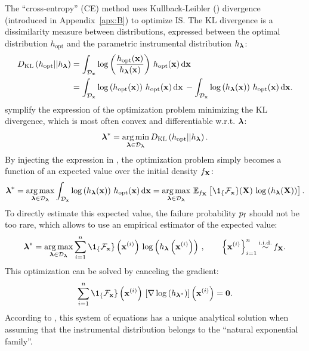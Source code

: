 The ``cross-entropy'' (CE) method \citep{rubinstein_2004_CE} uses Kullback-Leibler () divergence (introduced in Appendix~\ref{apx:B}) to optimize IS. 
The KL divergence is a dissimilarity measure between distributions, expressed between the optimal distribution $h_{\mathrm{opt}}$ and the parametric instrumental distribution $h_{\boldsymbol{\lambda}}$: 
\begin{subequations}
    \begin{align}
        D_{\mathrm{KL}}\left(h_{\mathrm{opt}} || h_{\boldsymbol{\lambda}}\right) &= \int_{\mathcal{D}_{\bf x}} \log \left(\frac{h_{\mathrm{opt}}({\bf x})}{h_{\boldsymbol{\lambda}}({\bf x})}\right) \, h_{\mathrm{opt}}({\bf x}) \, \mathrm{d} {\bf x}\\
            &= \int_{\mathcal{D}_{\bf x}} \log\left(h_{\mathrm{opt}}({\bf x})\right) \, h_{\mathrm{opt}}({\bf x}) \, \mathrm{d} {\bf x} \, - \int_{\mathcal{D}_{\bf x}} \log\left(h_{\boldsymbol{\lambda}}({\bf x})\right) \, h_{\mathrm{opt}}({\bf x}) \, \mathrm{d} {\bf x}.
    \label{eq:KL}
    \end{align}
\end{subequations}
\citet{rubinstein_2004_CE} symplify the expression of the optimization problem minimizing the KL divergence, which is most often convex and differentiable w.r.t. ${\boldsymbol{\lambda}}$:  
\begin{equation}
    {\boldsymbol{\lambda}}^* = \operatorname*{arg\,min}_{{\boldsymbol{\lambda}} \in \mathcal{D}_{\boldsymbol{\lambda}}} D_{\mathrm{KL}}\left(h_{\mathrm{opt}} || h_{\boldsymbol{\lambda}}\right). 
\end{equation}
By injecting the expression in , the optimization problem simply becomes a function of an expected value over the initial density $f_{\bf X}$:
\begin{equation}
    \blambda^* = \argmax_{\blambda \in \iD_\blambda} \int_{\iD_\bx} \log\left(h_\blambda(\bx)\right) \, h_{\mathrm{opt}}(\bx) \, \dd \bx
                = \argmax_{\blambda \in \iD_\blambda} \, \E_{f_\bX}\left[\1_\{\iF_\bx\}(\bX) \, \log\left(h_\blambda(\bX)\right) \right].
    \label{eq:empirical_KL}
\end{equation}
To directly estimate this expected value, the failure probability $p_\mathrm{f}$ should not be too rare, which allows to use an empirical estimator of the expected value:
\begin{equation}
        \blambda^* = \argmax_{\blambda \in \iD_\blambda} \sum_{i=1}^{n} \1_\{\iF_\bx\}\left(\bx^{(i)}\right) \, \log\left(h_\blambda\left(\bx^{(i)}\right)\right) \, , \qquad
        \left\{ \bx^{(i)} \right\}_{i=1}^n \simiid f_\bX.
\end{equation}
This optimization can be solved by canceling the gradient: 
\begin{equation}
    \sum_{i=1}^{n} \1_\{\iF_\bx\}\left(\bx^{(i)}\right) \, \left[\nabla \log\left(h_{\blambda^*}\right)\right]\left(\bx^{(i)}\right) = \mathbf{0}.
\end{equation}
According to \citet{rubinstein_2004_CE}, this system of equations has a unique analytical solution when assuming that the instrumental distribution belongs to the ``natural exponential family''. 

